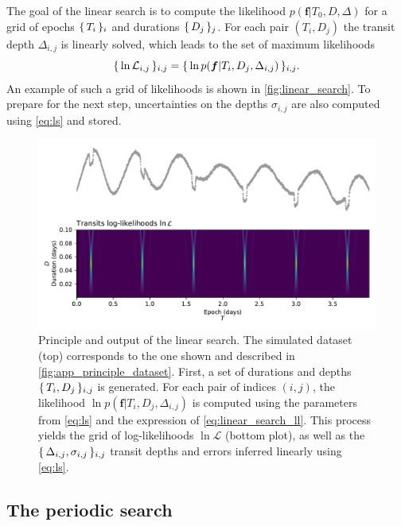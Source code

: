 \documentclass[modern]{aastex631}
\begin{document}
The goal of the linear search is to compute the likelihood $p(\bm{f} \vert T_0 , D, \Delta)$ for a grid of epochs $\{\,T_i\,\}_i$ and durations $\{\,D_j\,\}_j$. For each pair $(T_i, D_j)$ the transit depth $\Delta_{i, j}$ is linearly solved, which leads to the set of maximum likelihoods
\begin{equation*}
    \set{\ln\mathcal{L}_{i,j}}_{i, j} = \set{\ln p(\bm{f} \vert T_i ,D_j, \Delta_{i, j})}_{i, j}.
\end{equation*}
An example of such a grid of likelihoods is shown in \autoref{fig:linear_search}. To prepare for the next step, uncertainties on the depths $\sigma_{i,j}$ are also computed using \autoref{eq:ls} and stored.
\begin{figure}[H]
    \begin{centering}
        \includegraphics[width=\linewidth]{./principle_linear_search.pdf}
        \caption{Principle and output of the linear search. The simulated dataset (top) corresponds to the one shown and described in \autoref{fig:app_principle_dataset}. First, a set of durations and depths $\{\,T_i, D_j\,\}_{i,j}$ is generated. For each pair of indices $(i,j)$, the likelihood $\ln p(\bm{f} \vert T_i ,D_j, \Delta_{i,j})$ is computed using the parameters from \autoref{eq:ls} and the expression of \autoref{eq:linear_search_ll}. This process yields the grid of log-likelihoods $\ln\mathcal{L}$ (bottom plot), as well as the $\{\,\Delta_{i,j}, \sigma_{i,j}\,\}_{i, j}$ transit depths and errors inferred linearly using \autoref{eq:ls}. }
        \label{fig:linear_search}
    \end{centering}
\end{figure}

\subsection{The periodic search}\label{periodic_search}
\end{document}
